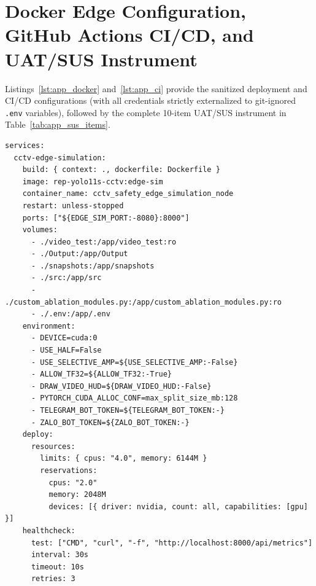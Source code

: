 \section{Docker Edge Configuration, GitHub Actions CI/CD, and UAT/SUS Instrument}
\label{app:devops_uat}

Listings~\ref{lst:app_docker} and~\ref{lst:app_ci} provide the sanitized deployment and CI/CD configurations (with all credentials strictly externalized to git-ignored \texttt{.env} variables), followed by the complete 10-item UAT/SUS instrument in Table~\ref{tab:app_sus_items}.

\begin{lstlisting}[basicstyle=\fontsize{6.8pt}{7.6pt}\selectfont\ttfamily, aboveskip=1pt, belowskip=1pt, caption={Sanitized Single-Container Docker Edge Simulation (\texttt{docker-compose.edge-simulation.yml}).}, label={lst:app_docker}]
services:
  cctv-edge-simulation:
    build: { context: ., dockerfile: Dockerfile }
    image: rep-yolo11s-cctv:edge-sim
    container_name: cctv_safety_edge_simulation_node
    restart: unless-stopped
    ports: ["${EDGE_SIM_PORT:-8080}:8000"]
    volumes:
      - ./video_test:/app/video_test:ro
      - ./Output:/app/Output
      - ./snapshots:/app/snapshots
      - ./src:/app/src
      - ./custom_ablation_modules.py:/app/custom_ablation_modules.py:ro
      - ./.env:/app/.env
    environment:
      - DEVICE=cuda:0
      - USE_HALF=False
      - USE_SELECTIVE_AMP=${USE_SELECTIVE_AMP:-False}
      - ALLOW_TF32=${ALLOW_TF32:-True}
      - DRAW_VIDEO_HUD=${DRAW_VIDEO_HUD:-False}
      - PYTORCH_CUDA_ALLOC_CONF=max_split_size_mb:128
      - TELEGRAM_BOT_TOKEN=${TELEGRAM_BOT_TOKEN:-}
      - ZALO_BOT_TOKEN=${ZALO_BOT_TOKEN:-}
    deploy:
      resources:
        limits: { cpus: "4.0", memory: 6144M }
        reservations:
          cpus: "2.0"
          memory: 2048M
          devices: [{ driver: nvidia, count: all, capabilities: [gpu] }]
    healthcheck:
      test: ["CMD", "curl", "-f", "http://localhost:8000/api/metrics"]
      interval: 30s
      timeout: 10s
      retries: 3
\end{lstlisting}


